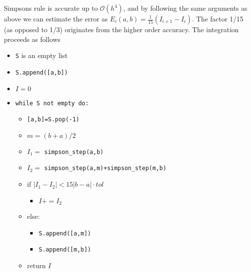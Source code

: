 \documentclass[graybox,sectrefs,envcountresetchap,open=right,final]{svmonodo}
\begin{document}
\noindent
Simpsons rule is accurate up to $\mathcal{O}(h^4)$, and by following the same arguments as above we can estimate the error as $E_i(a,b)=\frac{1}{15}(I_{i+1}-I_{i})$. The factor 1/15 (as opposed to 1/3) originates from the higher order accuracy. The integration proceeds as follows
\begin{itemize}
\item \texttt{S} is an empty list

\item \texttt{S.append([a,b])}

\item $I=0$

\item \texttt{while S not empty do:}
\begin{itemize}

  \item \texttt{[a,b]=S.pop(-1)}

  \item $m=(b+a)/2$

  \item $I_1=$ \Verb!simpson_step(a,b)!

  \item $I_2=$ \Verb!simpson_step(a,m)+simpson_step(m,b)!

  \item if $|I_1-I_2|<15|b-a|\cdot tol$
\begin{itemize}

    \item $I+=I_2$

\end{itemize}

\noindent
  \item else:
\begin{itemize}

    \item \texttt{S.append([a,m])}

    \item \texttt{S.append([m,b])}

\end{itemize}

\noindent
  \item return $I$
\end{itemize}

\noindent
\end{itemize}
\end{document}

